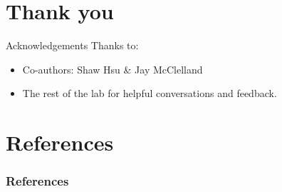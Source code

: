 \documentclass{beamer}
\begin{document}
\section{Thank you}
\begin{frame}{Acknowledgements}
Thanks to:
\begin{itemize}
    \item Co-authors: Shaw Hsu \& Jay McClelland
    \item The rest of the lab for helpful conversations and feedback. 
\end{itemize}
\end{frame}

\section{References}
\begin{frame}[allowframebreaks]
\frametitle{References}


\end{frame}
\end{document}
